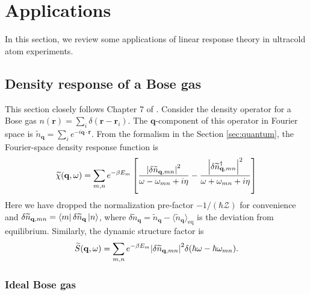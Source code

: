 \documentclass[reprint,
nofootinbib,
amsmath,amssymb,
aps]{revtex4-1}
\newcommand{\be}{\beta}
\newcommand{\f}[2]{\frac{#1}{#2}}
\newcommand{\lb}{\left[}
\newcommand{\rb}{\right]}
\begin{document}
\section{Applications}

In this section, we review some applications of linear response theory in ultracold atom experiments. 
 
\subsection{Density response of a Bose gas}

This section closely follows Chapter 7 of \cite{pitaevskii2016bose}. Consider the density operator for a Bose gas $n(\mathbf{r}) = \sum_i \delta(\mathbf{r} - \mathbf{r}_i)$. The $\mathbf{q}$-component of this operator in Fourier space is $\widetilde{n}_\mathbf{q} = \sum_i e^{-i \mathbf{q}\cdot \mathbf{r}}$. From the formalism in the Section \ref{sec:quantum}, the Fourier-space density response function is
\begin{align*}
\widetilde{\chi}(\mathbf{q},\omega) = \sum_{m,n} e^{-\be E_m} 
\lb 
\f{\abs{\delta \widetilde{n}_{\mathbf{q},mn}}^2}{\omega - \omega_{mn} + i\eta} 
- 
\f{\abs{\delta \widetilde{n}_{\mathbf{q},mn}^\dagger}^2}{\omega + \omega_{mn} + i\eta} 
\rb
\end{align*}
Here we have dropped the normalization pre-factor $-1/(\hbar \mathcal{Z})$ for convenience and $\delta \widetilde{n}_{\mathbf{q},mn} = \bra{m} \delta \widetilde{n}_{\mathbf{q}} \ket{n}$, where $\delta \widetilde{n}_\mathbf{q} = \widetilde{n}_\mathbf{q} - \langle \widetilde{n}_\mathbf{q} \rangle_\text{eq}$ is the deviation from equilibrium. Similarly, the dynamic structure factor is 
\begin{align*}
\widetilde{S}(\mathbf{q},\omega) = \sum_{m,n} e^{-\be E_m} \abs{\delta \widetilde{n}_{\mathbf{q},mn}}^2 \delta(\hbar \omega - \hbar \omega_{mn}).
\end{align*}

\subsubsection{Ideal Bose gas}
\end{document}
